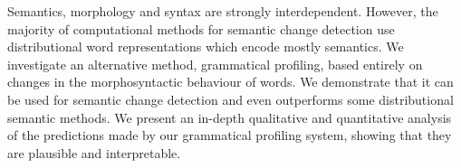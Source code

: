 Semantics, morphology and syntax are strongly interdependent. However, the majority of computational methods for semantic change detection use distributional word representations which encode mostly semantics. We investigate an alternative method, grammatical profiling, based entirely on changes in the morphosyntactic behaviour of words. We demonstrate that it can be used for semantic change detection and even outperforms some distributional semantic methods. We present an in-depth qualitative and quantitative analysis of the predictions made by our grammatical profiling system, showing that they are plausible and interpretable.
